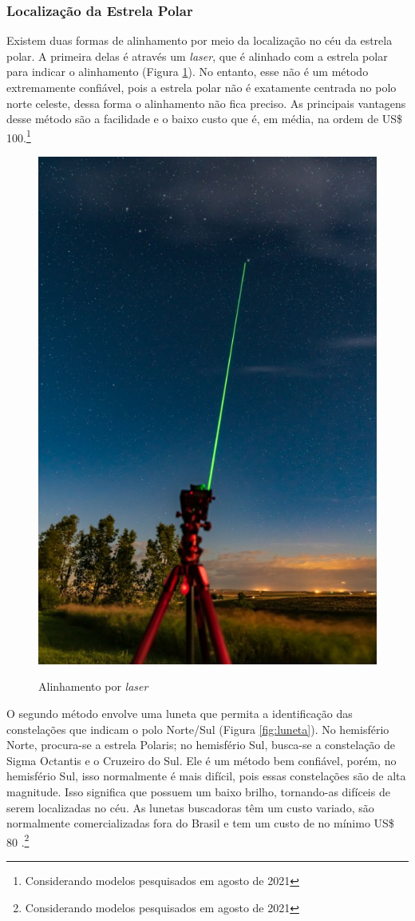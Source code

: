 \subsubsection{Localização da Estrela Polar}
Existem duas formas de alinhamento por meio da localização no céu da estrela polar. A primeira delas é através um \textit{laser}, que é alinhado com a estrela polar para indicar o alinhamento (Figura \ref{fig:alinhamentolaser}). No entanto, esse não é um método extremamente confiável, pois a estrela polar não é exatamente centrada no polo norte celeste, dessa forma o alinhamento não fica preciso. As principais vantagens desse método são a facilidade e o baixo custo que é, em média, na ordem de US\$ 100.\footnote{Considerando modelos pesquisados em agosto de 2021}

 \begin{figure}[!htb]
	\centering
	\caption{Alinhamento por \textit{laser}}
	\includegraphics[width=0.3\linewidth]{figuras/revisaobiblio/alinhamentolaser}
	\label{fig:alinhamentolaser}
\end{figure}


O segundo método envolve uma luneta que permita a identificação das constelações que indicam o polo Norte/Sul (Figura \ref{fig:luneta}). No hemisfério Norte, procura-se a estrela Polaris; no hemisfério Sul, busca-se a constelação de Sigma Octantis e o Cruzeiro do Sul. Ele é um método bem confiável, porém, no hemisfério Sul, isso normalmente é mais difícil, pois essas constelações são de alta magnitude. Isso significa que possuem um baixo brilho, tornando-as difíceis de serem localizadas no céu. As lunetas buscadoras têm um custo variado, são normalmente comercializadas fora do Brasil e tem um custo de no mínimo US\$ 80 .\footnote{Considerando modelos pesquisados em agosto de 2021}

